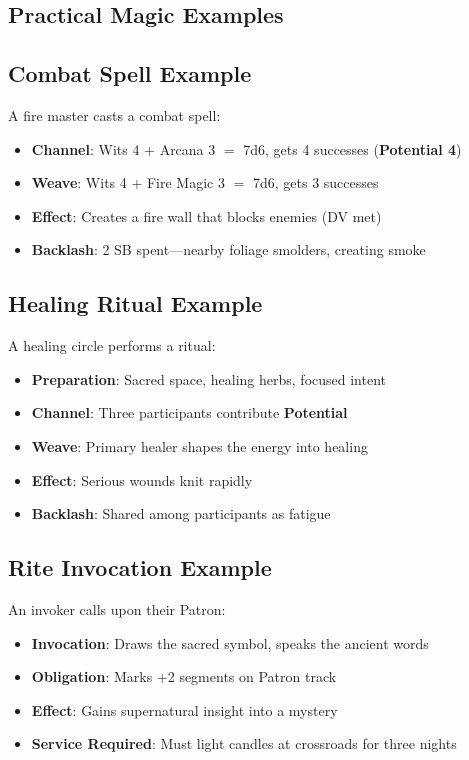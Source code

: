 \begin{multicols}{2}
\section{Practical Magic Examples} 

\subsection*{Combat Spell Example}
A fire master casts a combat spell:
\begin{itemize}
\item \textbf{Channel}: Wits 4 + Arcana 3 $=$ 7d6, gets 4 successes (\textbf{Potential 4})
\item \textbf{Weave}: Wits 4 + Fire Magic 3 $=$ 7d6, gets 3 successes
\item \textbf{Effect}: Creates a fire wall that blocks enemies (DV met)
\item \textbf{Backlash}: 2 SB spent—nearby foliage smolders, creating smoke
\end{itemize}

\subsection*{Healing Ritual Example}
A healing circle performs a ritual:
\begin{itemize}
\item \textbf{Preparation}: Sacred space, healing herbs, focused intent
\item \textbf{Channel}: Three participants contribute \textbf{Potential}
\item \textbf{Weave}: Primary healer shapes the energy into healing
\item \textbf{Effect}: Serious wounds knit rapidly
\item \textbf{Backlash}: Shared among participants as fatigue
\end{itemize}

\subsection*{Rite Invocation Example}
An invoker calls upon their Patron:
\begin{itemize}
\item \textbf{Invocation}: Draws the sacred symbol, speaks the ancient words
\item \textbf{Obligation}: Marks +2 segments on Patron track
\item \textbf{Effect}: Gains supernatural insight into a mystery
\item \textbf{Service Required}: Must light candles at crossroads for three nights
\end{itemize}


\end{multicols}
